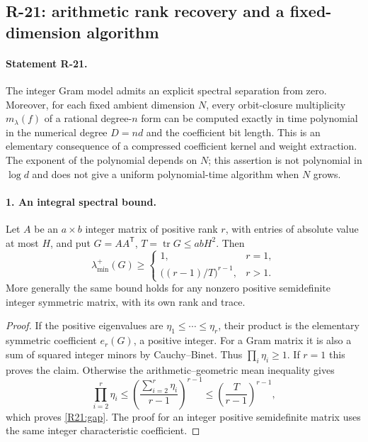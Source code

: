 \subsection{R-21: arithmetic rank recovery and a fixed-dimension algorithm}

\paragraph{Statement R-21.}
The integer Gram model admits an explicit spectral separation from
zero. Moreover, for each fixed ambient dimension $N$, every orbit-closure
multiplicity $m_\lambda(f)$ of a rational degree-$n$ form can be computed
exactly in time polynomial in the numerical degree $D=nd$ and the
coefficient bit length. This is an elementary consequence of a compressed
coefficient kernel and weight extraction. The exponent of the polynomial
depends on $N$; this assertion is not polynomial in $\log d$ and does not
give a uniform polynomial-time algorithm when $N$ grows.

\paragraph{1. An integral spectral bound.}
Let $A$ be an $a\times b$ integer matrix of positive rank $r$, with
entries of absolute value at most $H$, and put $G=AA^{\mathsf T}$,
$T=\operatorname{tr}G\leq abH^2$. Then
\begin{equation}\label{R21:gap}
 \lambda_{\min}^{+}(G)\geq
 \begin{cases}
 1,&r=1,\\[1mm]
 \bigl((r-1)/T\bigr)^{r-1},&r>1.
 \end{cases}
\end{equation}
More generally the same bound holds for any nonzero positive semidefinite
integer symmetric matrix, with its own rank and trace.

\begin{proof}
If the positive eigenvalues are $\eta_1\leq\cdots\leq\eta_r$, their
product is the elementary symmetric coefficient $e_r(G)$, a positive
integer. For a Gram matrix it is also a sum of squared integer minors
by Cauchy--Binet. Thus $\prod_i\eta_i\geq1$.
If $r=1$ this proves the claim. Otherwise the arithmetic--geometric
mean inequality gives
\[
 \prod_{i=2}^r\eta_i\leq
 \left(\frac{\sum_{i=2}^r\eta_i}{r-1}\right)^{r-1}
 \leq\left(\frac{T}{r-1}\right)^{r-1},
\]
which proves \eqref{R21:gap}. The proof for an integer positive
semidefinite matrix uses the same integer characteristic coefficient.
\end{proof}

